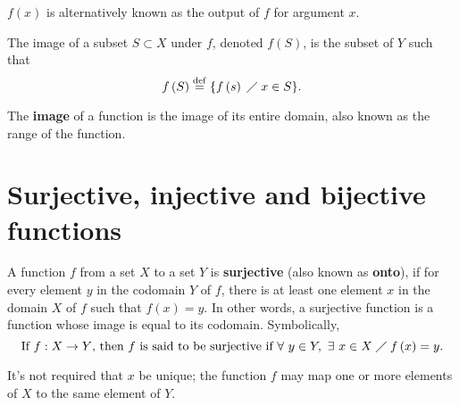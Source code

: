 \begin{note}
    $f\left( x \right) $ is alternatively known as the output of $f$ for argument $x$.
\end{note}

\begin{defi}
    The image of a subset $S\subset X$ under $f$, denoted $f\left( S \right) $, is the subset of $Y$ such that
    \begin{equation}
        f\left( S \right) \overset{\mathrm{def}}{=} \{f\left( s \right) \;\diagup\; x\in S\}.
    \end{equation}
\end{defi}

\begin{defi}
    The \textbf{image} of a function is the image of its entire domain, also known as the range of the function.
\end{defi}


\section{Surjective, injective and bijective functions}
\begin{defi}
    A function $f$ from a set $X$ to a set $Y$ is \textbf{surjective} (also known as \textbf{onto}), if for every element $y$ in the codomain $Y$ of $f$, there is at least one element $x$ in the domain $X$ of $f$ such that $f\left( x \right) = y$. In other words, a surjective function is a function whose image is equal to its codomain. Symbolically,
    \begin{equation}
        \textrm{If } f:X\to Y\textrm{, then $f$ is said to be surjective if } \forall\ y\in Y,\ \exists\ x\in X \;\diagup\; f\left( x \right) = y.
    \end{equation}
\end{defi}

\begin{remark}
    It's not required that $x$ be unique; the function $f$ may map one or more elements of $X$ to the same element of $Y$.
\end{remark}

